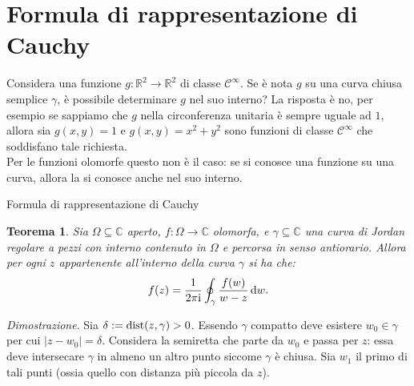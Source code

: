 \documentclass[11pt]{book}
\makeatletter
\theoremstyle{Definizione}
\theoremstyle{TeoremaProposizioneLemmaCorollarioCongettura}
\newtheorem{myteo}{Teorema}[section]
\theoremstyle{OsservazioneNotaEsempio}
\renewenvironment{proof}[1][\proofname]{\par
  \normalfont \topsep6\p@\@plus6\p@\relax
  \trivlist
  \item[\hskip\labelsep
        \itshape
    #1\@addpunct{.}]\ignorespaces
}{%
  \endtrivlist\@endpefalse
}
\renewenvironment{proof}{\textsl{Dimostrazione}.}{}
\newcommand{\R}{\mathbb{R}}
\newcommand{\C}{\mathbb{C}}
\renewcommand{\i}{\textup{i}}
\renewcommand{\d}{\mathrm{d}}
\newcommand{\dw}{\,\d w}
\newcommand{\dist}{\textup{dist}}
\makeatother
\begin{document}
\section{Formula di rappresentazione di Cauchy}
Considera una funzione $g:\R^2\longrightarrow \R^2$ di classe $\mathscr{C}^\infty$. Se è nota $g$ su una curva chiusa semplice $\gamma$, è possibile determinare $g$ nel suo interno? La risposta è no, per esempio se sappiamo che $g$ nella circonferenza unitaria è sempre uguale ad $1$, allora sia $g(x,y) = 1$ e $g(x,y) = x^2+y^2$ sono funzioni di classe $\mathscr{C}^\infty$ che soddisfano tale richiesta.\\
Per le funzioni olomorfe questo non è il caso: se si conosce una funzione su una curva, allora la si conosce anche nel suo interno.
\begin{boxteo}{Formula di rappresentazione di Cauchy}
\begin{myteo}\label{teo:FormulaDiRappresentazioneDiCauchy}
Sia $\Omega\subseteq \C$ aperto, $f:\Omega \longrightarrow \C$ olomorfa, e $\gamma \subseteq \C$ una curva di Jordan regolare a pezzi con interno contenuto in $\Omega$ e percorsa in senso antiorario. Allora per ogni $z$ appartenente all'interno della curva $\gamma$ si ha che:
$$
f(z) = \frac{1}{2\pi\i}\oint_{\gamma} \frac{f(w)}{w-z}\dw.
$$
\end{myteo}
\tcblower
\begin{proof}
Sia $\delta := \dist(z,\gamma) > 0$. Essendo $\gamma$ compatto deve esistere $w_0\in \gamma$ per cui $|z-w_0| = \delta$. Considera la semiretta che parte da $w_0$ e passa per $z$: essa deve intersecare $\gamma$ in almeno un altro punto siccome $\gamma$ è chiusa. Sia $w_1$ il primo di tali punti (ossia quello con distanza più piccola da $z$).
\begin{center}
\end{center}
\end{proof}
\end{boxteo}
\end{document}
